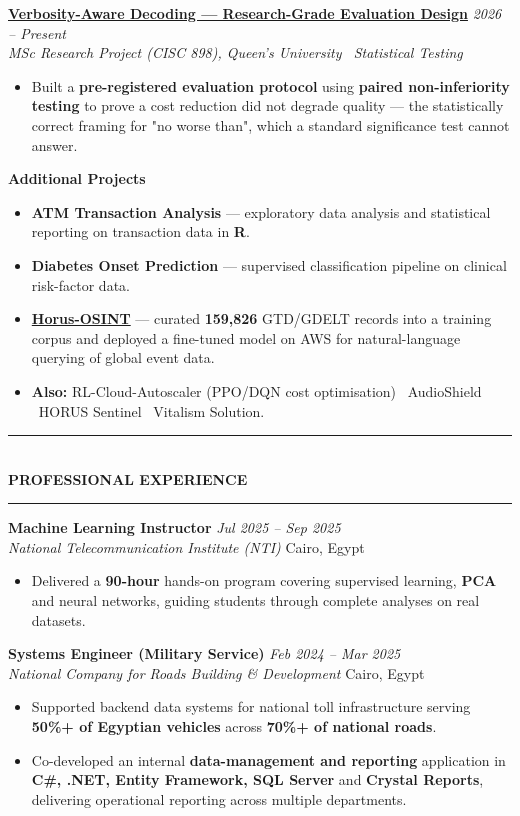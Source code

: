 \documentclass[10pt, a4paper]{article}
\newcommand{\cvsection}[1]{%
  \vspace{3pt}%
  {\color{navy}\rule{\linewidth}{1.1pt}}\\[0.5pt]%
  {\color{navy}\bfseries\fontsize{9.5}{11}\selectfont\uppercase{#1}}\\[-4pt]%
  {\color{teal}\rule{\linewidth}{0.6pt}}%
  \vspace{2pt}%
}
\newcommand{\cventry}[4]{%
  \vspace{2.5pt}%
  \textbf{\color{darkgray}#1} \hfill {\color{midgray}\textit{#3}}\\[-1.5pt]%
  {\color{teal}\textit{#2}} \hfill {\color{midgray}#4}%
}
\newcommand{\cvproject}[3]{%
  \vspace{2.5pt}%
  {\bfseries\color{navy}#1} \hfill {\color{midgray}\textit{#3}}\\[-1.5pt]%
  {\color{teal}\textit{#2}}%
}
\newcommand{\cvmini}[2]{\item {\bfseries\color{navy}#1} --- #2}
\newenvironment{cvitems}{%
  \begin{itemize}[leftmargin=11pt, itemsep=0.5pt, parsep=0pt, topsep=1pt,
                  label={\textcolor{teal}{$\bullet$}}]
}{%
  \end{itemize}%
}
\begin{document}
\cvproject{\href{https://github.com/MahmoudAlyosify/minimal-lm}{Verbosity-Aware Decoding --- Research-Grade Evaluation Design}}
          {MSc Research Project (CISC 898), Queen's University \textperiodcentered\ Statistical Testing}
          {2026 -- Present}
\begin{cvitems}
  \item Built a \textbf{pre-registered evaluation protocol} using \textbf{paired non-inferiority testing} to prove a cost reduction did not degrade quality --- the statistically correct framing for "no worse than", which a standard significance test cannot answer.
\end{cvitems}

\vspace{3pt}
{\bfseries\color{navy}Additional Projects}
\begin{cvitems}
  \cvmini{ATM Transaction Analysis}{exploratory data analysis and statistical reporting on transaction data in \textbf{R}.}
  \cvmini{Diabetes Onset Prediction}{supervised classification pipeline on clinical risk-factor data.}
  \cvmini{\href{https://github.com/MahmoudAlyosify/Horus-OSINT}{Horus-OSINT}}{curated \textbf{159,826} GTD/GDELT records into a training corpus and deployed a fine-tuned model on AWS for natural-language querying of global event data.}
  \item \textbf{Also:} RL-Cloud-Autoscaler (PPO/DQN cost optimisation) \textperiodcentered\ AudioShield \textperiodcentered\ HORUS Sentinel \textperiodcentered\ Vitalism Solution.
\end{cvitems}

\cvsection{Professional Experience}

\cventry{Machine Learning Instructor}{National Telecommunication Institute (NTI)}
        {Jul 2025 -- Sep 2025}{Cairo, Egypt}
\begin{cvitems}
  \item Delivered a \textbf{90-hour} hands-on program covering supervised learning, \textbf{PCA} and neural networks, guiding students through complete analyses on real datasets.
\end{cvitems}

\cventry{Systems Engineer (Military Service)}{National Company for Roads Building \& Development}
        {Feb 2024 -- Mar 2025}{Cairo, Egypt}
\begin{cvitems}
  \item Supported backend data systems for national toll infrastructure serving \textbf{50\%+ of Egyptian vehicles} across \textbf{70\%+ of national roads}.
  \item Co-developed an internal \textbf{data-management and reporting} application in \textbf{C\#, .NET, Entity Framework, SQL Server} and \textbf{Crystal Reports}, delivering operational reporting across multiple departments.
\end{cvitems}
\end{document}
